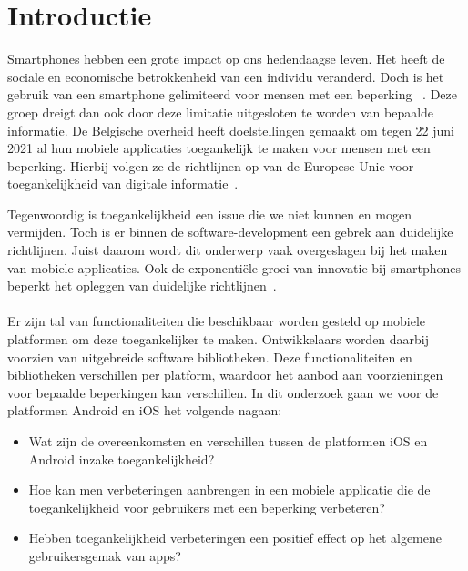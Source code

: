 
\section{Introductie} %
\label{sec:introductie}

Smartphones hebben een grote impact op ons hedendaagse leven. Het heeft de sociale en economische betrokkenheid van een individu veranderd.  Doch is het gebruik van een smartphone gelimiteerd voor mensen met een beperking
~\autocite{morris2014wireless}. Deze groep dreigt dan ook door deze limitatie uitgesloten te worden van bepaalde informatie. De Belgische overheid heeft doelstellingen gemaakt om tegen 22 juni 2021 al hun mobiele applicaties toegankelijk te maken voor mensen met een beperking. Hierbij volgen ze de richtlijnen op van de Europese Unie voor toegankelijkheid van digitale informatie~\autocite{Knacktoegankelijkheid2018}.

Tegenwoordig is toegankelijkheid een issue die we niet kunnen en mogen vermijden. Toch is er binnen de software-development een gebrek aan duidelijke richtlijnen. Juist daarom wordt dit onderwerp vaak overgeslagen bij het maken van mobiele applicaties. Ook de exponentiële groei van innovatie bij smartphones beperkt het opleggen van duidelijke richtlijnen~\autocite{diaz2014accessibility}. 
\\~\\
Er zijn  tal van functionaliteiten die beschikbaar worden gesteld op mobiele platformen om deze toegankelijker te maken. Ontwikkelaars worden daarbij voorzien van uitgebreide software bibliotheken. Deze functionaliteiten en bibliotheken verschillen per platform, waardoor het aanbod aan voorzieningen voor bepaalde beperkingen kan verschillen. In dit onderzoek gaan we voor de platformen Android en iOS het volgende nagaan:




\begin{itemize}
    \setlength\itemsep{0.5 em}
    \item Wat zijn de overeenkomsten en verschillen tussen de platformen iOS en Android inzake toegankelijkheid?
  \item Hoe kan men verbeteringen aanbrengen in een mobiele applicatie die de toegankelijkheid voor gebruikers met een beperking verbeteren?
  \item Hebben toegankelijkheid verbeteringen een positief effect op het algemene gebruikersgemak van apps? 
  
\end{itemize}

